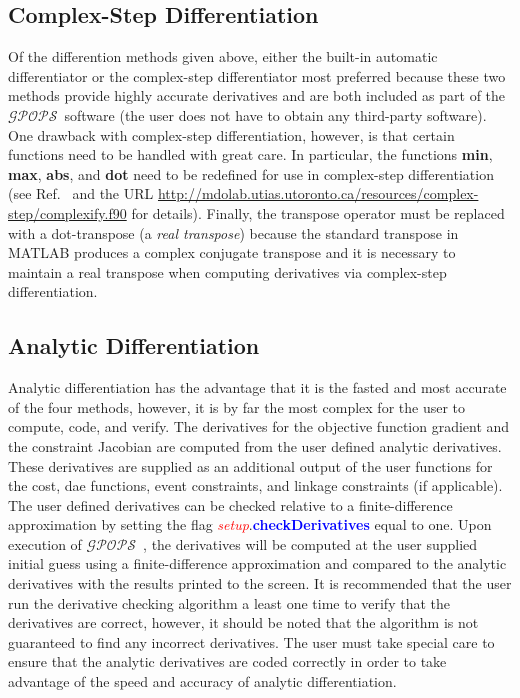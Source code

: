 \documentclass[10pt,final]{report}
\newcommand{\gpops}{$\mathcal{GPOPS}$~}
\newcommand{\bfblue}[1]{\textcolor{blue}{\bf #1}}
\newcommand{\slred}[1]{\textcolor{red}{\sl #1}}
\begin{document}
\subsection{Complex-Step Differentiation}

Of the differention methods given above, either the built-in automatic
differentiator or the complex-step differentiator most preferred
because these two methods provide highly accurate derivatives and are
both included as part of the \gpops software (\ie the user
does not have to obtain any third-party software). One drawback with
complex-step differentiation, however, is that certain functions need
to be handled with great care.  In particular, the functions {\bf
  min}, {\bf max}, {\bf abs}, and {\bf dot} need to be redefined for
use in complex-step differentiation (see Ref.~ and the URL
\url{http://mdolab.utias.utoronto.ca/resources/complex-step/complexify.f90}
for details).  Finally, the transpose operator must be replaced with a
dot-transpose (\ie a {\em real transpose}) because the standard
transpose in MATLAB produces a complex conjugate transpose and it is
necessary to maintain a real transpose when computing derivatives via
complex-step differentiation.

\subsection{Analytic Differentiation}
Analytic differentiation has the advantage that it is the fasted and most accurate of the four methods, however, it is by far the most complex for the user to compute, code, and verify.  The derivatives for the objective function gradient and the constraint Jacobian are computed from the user defined analytic derivatives.  These derivatives are supplied as an additional output of the user functions for the cost, dae functions, event constraints, and linkage constraints (if applicable).
The user defined derivatives can be checked relative to a finite-difference approximation by setting the flag \slred{setup}.\bfblue{checkDerivatives} equal to one. Upon execution of \gpops, the derivatives will be computed at the user supplied initial guess using a finite-difference approximation and compared to the analytic derivatives with the results printed to the screen.  It is recommended that the user run the derivative checking algorithm a least one time to verify that the derivatives are correct, however, it should be noted that the algorithm is not guaranteed to find any incorrect derivatives.  The user must take special care to ensure that the analytic derivatives are coded correctly in order to take advantage of the speed and accuracy of analytic differentiation.
\end{document}
